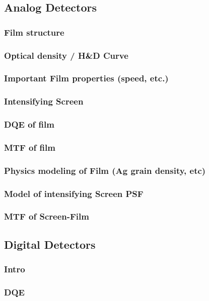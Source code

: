 \documentclass[mphy386-notes.tex]{subfiles}
\begin{document}

\subsection{Analog Detectors}
\subsubsection{Film structure}
\subsubsection{Optical density / H\&D Curve}
\subsubsection{Important Film properties (speed, etc.)}
\subsubsection{Intensifying Screen}
\subsubsection{DQE of film}
\subsubsection{MTF of film}
\subsubsection{Physics modeling of Film (Ag grain density, etc)}
\subsubsection{Model of intensifying Screen PSF}
\subsubsection{MTF of Screen-Film}
\subsection{Digital Detectors}
\subsubsection{Intro}
\subsubsection{DQE}
\end{document}
